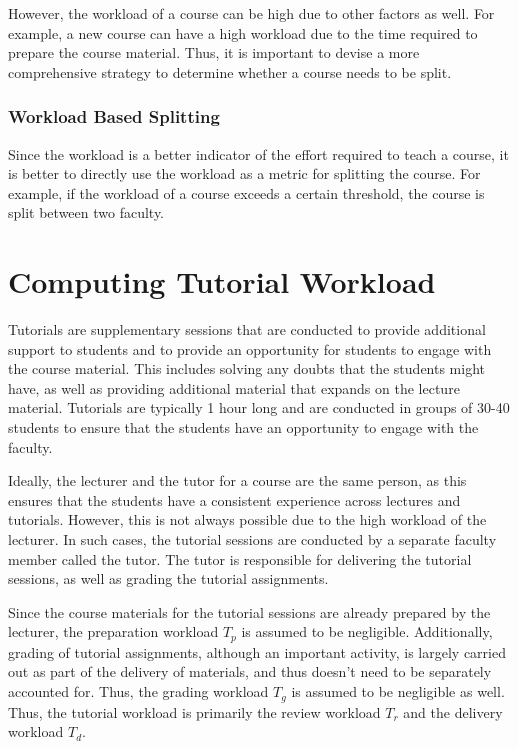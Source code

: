 However, the workload of a course can be high due to other factors as well. For example, a new course can have a high workload due to the time required to prepare the course material. Thus, it is important to devise a more comprehensive strategy to determine whether a course needs to be split.

\subsubsection{Workload Based Splitting}

Since the workload is a better indicator of the effort required to teach a course, it is better to directly use the workload as a metric for splitting the course. For example, if the workload of a course exceeds a certain threshold, the course is split between two faculty.


\section{Computing Tutorial Workload}

Tutorials are supplementary sessions that are conducted to provide additional support to students and to provide an opportunity for students to engage with the course material. This includes solving any doubts that the students might have, as well as providing additional material that expands on the lecture material. Tutorials are typically 1 hour long and are conducted in groups of 30-40 students to ensure that the students have an opportunity to engage with the faculty.

Ideally, the lecturer and the tutor for a course are the same person, as this ensures that the students have a consistent experience across lectures and tutorials. However, this is not always possible due to the high workload of the lecturer. In such cases, the tutorial sessions are conducted by a separate faculty member called the tutor. The tutor is responsible for delivering the tutorial sessions, as well as grading the tutorial assignments.

Since the course materials for the tutorial sessions are already prepared by the lecturer, the preparation workload \(T_p\) is assumed to be negligible. Additionally, grading of tutorial assignments, although an important activity, is largely carried out as part of the delivery of materials, and thus doesn't need to be separately accounted for. Thus, the grading workload \(T_g\) is assumed to be negligible as well. Thus, the tutorial workload is primarily the review workload \(T_r\) and the delivery workload \(T_d\).

